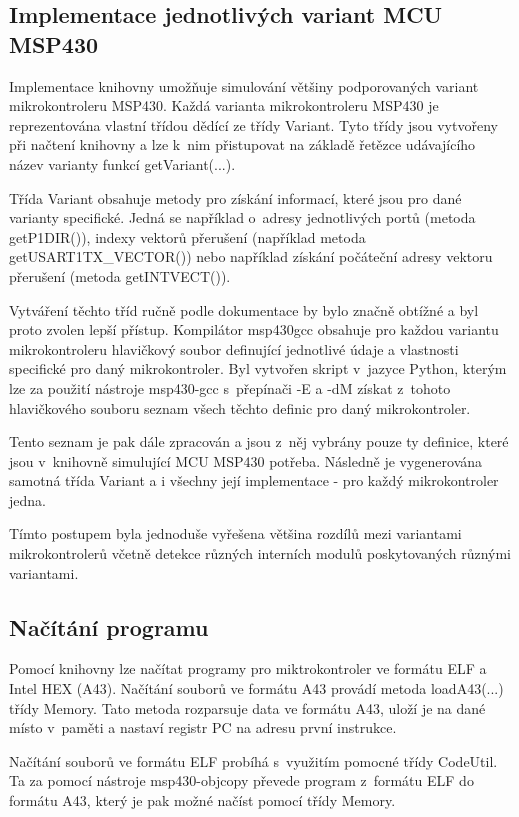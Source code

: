 \subsection{Implementace jednotlivých variant MCU MSP430}

Implementace knihovny umožňuje simulování většiny podporovaných variant mikrokontroleru MSP430. Každá varianta mikrokontroleru MSP430 je reprezentována vlastní třídou dědící ze třídy Variant. Tyto třídy jsou vytvořeny při načtení knihovny a lze k~nim přistupovat na základě řetězce udávajícího název varianty funkcí getVariant(...).

Třída Variant obsahuje metody pro získání informací, které jsou pro dané varianty specifické. Jedná se například o~adresy jednotlivých portů (metoda getP1DIR()), indexy vektorů přerušení (například metoda getUSART1TX\_VECTOR()) nebo například získání počáteční adresy vektoru přerušení (metoda getINTVECT()).

Vytváření těchto tříd ručně podle dokumentace by bylo značně obtížné a byl proto zvolen lepší přístup. Kompilátor msp430gcc obsahuje pro každou variantu mikrokontroleru hlavičkový soubor definující jednotlivé údaje a vlastnosti specifické pro daný mikrokontroler. Byl vytvořen skript v~jazyce Python, kterým lze za použití nástroje msp430-gcc s~přepínači -E a -dM získat z~tohoto hlavičkového souboru seznam všech těchto definic pro daný mikrokontroler.

Tento seznam je pak dále zpracován a jsou z~něj vybrány pouze ty definice, které jsou v~knihovně simulující MCU MSP430 potřeba. Následně je vygenerována samotná třída Variant a i všechny její implementace - pro každý mikrokontroler jedna.

Tímto postupem byla jednoduše vyřešena většina rozdílů mezi variantami mikrokontrolerů včetně detekce různých interních modulů poskytovaných různými variantami.

\subsection{Načítání programu}

Pomocí knihovny lze načítat programy pro miktrokontroler ve formátu ELF a Intel HEX (A43). Načítání souborů ve formátu A43 provádí metoda loadA43(...) třídy Memory. Tato metoda rozparsuje data ve formátu A43, uloží je na dané místo v~paměti a nastaví registr PC na adresu první instrukce.

Načítání souborů ve formátu ELF probíhá s~využitím pomocné třídy CodeUtil. Ta za pomocí nástroje msp430-objcopy převede program z~formátu ELF do formátu A43, který je pak možné načíst pomocí třídy Memory.


